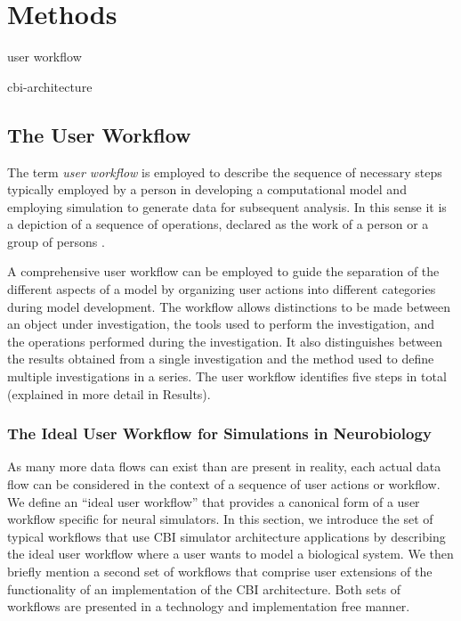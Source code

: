 \documentclass[12pt]{article}
\begin{document}
\section*{Methods}

user workflow

cbi-architecture

\subsection*{The User Workflow}

The term {\it user workflow} is employed to describe the sequence of
necessary steps typically employed by a person in developing a
computational model and employing simulation to generate data for
subsequent analysis. In this sense it is a depiction of a sequence of
operations, declared as the work of a person or a group of persons
\cite{Belhajjame:2001fv}.

A comprehensive user workflow can be employed to guide the separation
of the different aspects of a model by organizing user actions into
different categories during model development.  The workflow allows
distinctions to be made between an object under investigation, the
tools used to perform the investigation, and the operations performed
during the investigation. It also distinguishes between the results
obtained from a single investigation and the method used to define
multiple investigations in a series. The user workflow identifies five
steps in total (explained in more detail in Results).

\subsubsection*{The Ideal User Workflow for Simulations in Neurobiology}

As many more data flows can exist than are present in reality, each actual
data flow can be considered in the context of a sequence of user
actions or workflow. We define an ``ideal user workflow'' that provides a canonical form
of a user workflow specific for neural simulators. In this section, we introduce
the set of typical workflows that use CBI simulator architecture
applications by describing the ideal user workflow where a user wants to model a biological system. We then briefly mention a second set of workflows that comprise user extensions of the
functionality of an implementation of the CBI architecture. Both sets of workflows are presented in a technology and implementation free manner.
\end{document}
